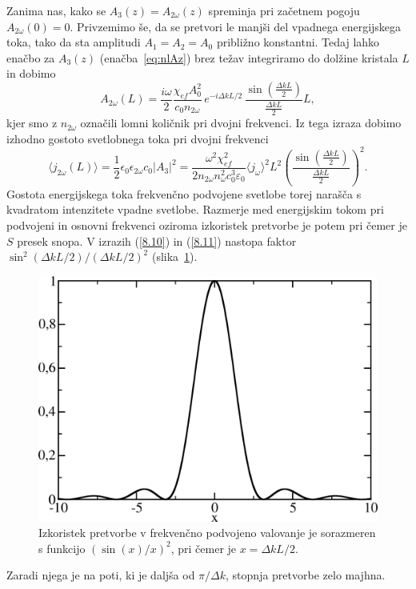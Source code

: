 Zanima nas, kako se $A_{3}(z) = A_{2\omega}(z)$ spreminja pri začetnem pogoju $A_{2\omega}(0)=0$.
Privzemimo še, da se pretvori le manjši del vpadnega energijskega toka,
tako da sta amplitudi $A_{1}=A_{2}=A_0$ približno konstantni. Tedaj lahko
enačbo za $A_{3}(z)$ (enačba~\ref{eq:nlAz}) brez težav integriramo do dolžine kristala $L$ in dobimo
\begin{equation}
A_{2\omega}(L)=\frac{i\omega}{2}\frac{\chi_{ef} A_0^2}{c_0 n_{2\omega}}
\,e^{-i\Delta kL/2}\, \frac{\sin\left(\frac{\Delta k L}{2}\right)}{\frac{\Delta kL}{2}}L,
\label{8.9}
\end{equation}
kjer smo z $n_{2\omega}$ označili lomni količnik pri dvojni frekvenci.
Iz tega izraza dobimo izhodno gostoto svetlobnega toka pri dvojni
frekvenci 
\begin{equation}
\langle j_{2\omega}(L) \rangle=\frac{1}{2}\epsilon_{0}\epsilon_{2\omega}c_0|A_3|^2 = 
\frac{\omega^2 \chi_{ef}^2}{2 n_{2\omega} n_\omega^2c_0^3\varepsilon_0}\langle j_\omega\rangle^2 L^2
\left(\frac{\sin\left(\frac{\Delta k L}{2}\right)}{\frac{\Delta kL}{2}}\right)^2.
\label{8.10}
\end{equation}
Gostota energijskega toka frekvenčno podvojene svetlobe torej narašča s kvadratom
intenzitete vpadne svetlobe. Razmerje med energijskim tokom pri podvojeni in osnovni frekvenci oziroma
izkoristek pretvorbe je potem
pri čemer je $S$ presek snopa. V izrazih (\ref{8.10}) in (\ref{8.11}) nastopa 
faktor $\sin^{2}(\Delta kL/2)/(\Delta kL/2)^{2}$ (slika~\ref{fig:shg2}). 
\begin{figure}[h]
\centering
\includegraphics[width=8truecm]{slike/08_shg2.png}
\caption{Izkoristek pretvorbe v frekvenčno podvojeno valovanje je sorazmeren s funkcijo $(\sin(x)/x)^2$,
pri čemer je $x = \Delta k L/2$.}
\label{fig:shg2}
\end{figure}
Zaradi njega je na poti, ki je daljša od $\pi /\Delta k$, stopnja pretvorbe zelo majhna.

